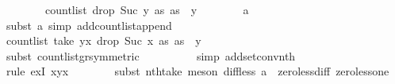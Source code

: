 \begin{isabellebody}
\ \ \ \ \ \ \ \ count{\isacharunderscore}{\kern0pt}list\ {\isacharparenleft}{\kern0pt}drop\ {\isacharparenleft}{\kern0pt}Suc\ y{\isacharparenright}{\kern0pt}\ as{\isacharparenright}{\kern0pt}\ {\isacharparenleft}{\kern0pt}as\ {\isacharbang}{\kern0pt}\ y{\isacharparenright}{\kern0pt}{\isachardoublequoteclose}\isanewline
\ \ \ \ \ \ \isamarkupfalse%
\ a{}{\isacharunderscore}{\kern0pt}{}\ \isamarkupfalse%
\ {\isacharparenleft}{\kern0pt}subst\ a{}{\isacharunderscore}{\kern0pt}{}{\isacharcomma}{\kern0pt}\ simp\ add{\isacharcolon}{\kern0pt}count{\isacharunderscore}{\kern0pt}list{\isacharunderscore}{\kern0pt}append{\isacharparenright}{\kern0pt}\isanewline
\ \ \ \ \isamarkupfalse%
\ \isamarkupfalse%
\ {\isachardoublequoteopen}count{\isacharunderscore}{\kern0pt}list\ {\isacharparenleft}{\kern0pt}take\ {\isacharparenleft}{\kern0pt}y{\isacharminus}{\kern0pt}x{\isacharparenright}{\kern0pt}\ {\isacharparenleft}{\kern0pt}drop\ {\isacharparenleft}{\kern0pt}Suc\ x{\isacharparenright}{\kern0pt}\ as{\isacharparenright}{\kern0pt}{\isacharparenright}{\kern0pt}\ {\isacharparenleft}{\kern0pt}as\ {\isacharbang}{\kern0pt}\ y{\isacharparenright}{\kern0pt}\ {\isasymge}\ {}{\isachardoublequoteclose}\isanewline
\ \ \ \ \ \ \isamarkupfalse%
\ {\isacharparenleft}{\kern0pt}subst\ count{\isacharunderscore}{\kern0pt}list{\isacharunderscore}{\kern0pt}gr{\isacharunderscore}{\kern0pt}{}{\isacharbrackleft}{\kern0pt}symmetric{\isacharbrackright}{\kern0pt}{\isacharparenright}{\kern0pt}\ \ \isanewline
\ \ \ \ \ \ \isamarkupfalse%
\ {\isacharparenleft}{\kern0pt}simp\ add{\isacharcolon}{\kern0pt}set{\isacharunderscore}{\kern0pt}conv{\isacharunderscore}{\kern0pt}nth{\isacharparenright}{\kern0pt}\isanewline
\ \ \ \ \ \ \isamarkupfalse%
\ {\isacharparenleft}{\kern0pt}rule\ exI{\isacharbrackleft}{\kern0pt}\ x{\isacharequal}{\kern0pt}{\isachardoublequoteopen}y{\isacharminus}{\kern0pt}x{\isacharminus}{\kern0pt}{}{\isachardoublequoteclose}{\isacharbrackright}{\kern0pt}{\isacharparenright}{\kern0pt}\isanewline
\ \ \ \ \ \ \isamarkupfalse%
\ {\isacharparenleft}{\kern0pt}subst\ nth{\isacharunderscore}{\kern0pt}take{\isacharcomma}{\kern0pt}\ meson\ diff{\isacharunderscore}{\kern0pt}less\ a{}{\isacharunderscore}{\kern0pt}{}\ \ zero{\isacharunderscore}{\kern0pt}less{\isacharunderscore}{\kern0pt}diff\ zero{\isacharunderscore}{\kern0pt}less{\isacharunderscore}{\kern0pt}one{\isacharparenright}{\kern0pt}\isanewline

\end{isabellebody}
